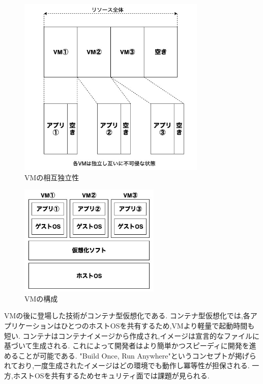 \begin{figure}[htbp]
\begin{center}
    \includegraphics[width=0.8\textwidth]{./figures/resource-on-vm.jpg}
    \caption{VMの相互独立性}
\end{center}
\end{figure}

\begin{figure}[htbp]
\begin{center}
    \includegraphics[width=0.6\textwidth]{./figures/vm-structure.jpg}
    \caption{VMの構成}
\end{center}
\end{figure}

VMの後に登場した技術がコンテナ型仮想化である.
コンテナ型仮想化では,各アプリケーションはひとつのホストOSを共有するため,VMより軽量で起動時間も短い.
コンテナはコンテナイメージから作成され,イメージは宣言的なファイルに基づいて生成される.
これによって開発者はより簡単かつスピーディに開発を進めることが可能である.
"Build Once, Run Anywhere"というコンセプトが掲げられており,一度生成されたイメージはどの環境でも動作し冪等性が担保される.
一方,ホストOSを共有するためセキュリティ面では課題が見られる.

